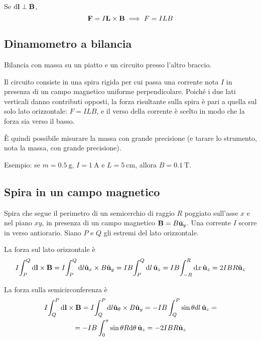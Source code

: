 Se $\mathrm{d} \mathbf{l} \perp \mathbf{B}$,
\begin{equation}
    \mathbf{F} = I \mathbf{L} \times \mathbf{B}
    \implies
    F = I L B
\end{equation}


\subsection{Dinamometro a bilancia}

Bilancia con massa su un piatto e un circuito presso l'altro braccio.

Il circuito consiste in una spira rigida per cui passa una corrente nota $I$ in presenza di un campo magnetico uniforme perpendicolare.
Poiché i due lati verticali danno contributi opposti, la forza risultante sulla spira è pari a quella sul solo lato orizzontale: $F = ILB$, e il verso della corrente è scelto in modo che la forza sia verso il basso.

È quindi possibile misurare la massa con grande precisione (e tarare lo strumento, nota la massa, con grande precisione).

Esempio: se $m = \qty{0.5}{\gram}$, $I = \qty{1}{\ampere}$ e $L = \qty{5}{\centi\metre}$, allora $B = \qty{0.1}{\tesla}$.

\subsection{Spira in un campo magnetico}

Spira che segue il perimetro di un semicerchio di raggio $R$ poggiato sull'asse $x$ e nel piano $xy$, in presenza di un campo magnetico $\mathbf{B} = B \hat{\mathbf{u}}_{y}$.
Una corrente $I$ scorre in verso antiorario. Siano $P$ e $Q$ gli estremi del lato orizzontale.

La forza sul lato orizzontale è
\begin{equation}
    I \!\int_P^Q \mathrm{d} \mathbf{l} \times \mathbf{B}
    = I \!\int_P^Q \mathrm{d} l \hat{\mathbf{u}}_{x} \times B \hat{\mathbf{u}}_{y}
    = I B \!\int_P^Q \mathrm{d} l \, \hat{\mathbf{u}}_{z}
    = I B \!\int_{-R}^R \mathrm{d} x \, \hat{\mathbf{u}}_{z}
    = 2IBR \hat{\mathbf{u}}_{z}
\end{equation}

La forza sulla semicirconferenza è
\begin{equation}
\begin{gathered}
    I \!\int_Q^P \mathrm{d} \mathbf{l} \times \mathbf{B}
    = I \!\int_Q^P \mathrm{d} l \hat{\mathbf{u}}_{\theta} \times B \hat{\mathbf{u}}_{y}
    = -IB \int_Q^P \sin\theta dl \, \hat{\mathbf{u}}_{z} = \\
    = -IB \int_0^\pi \sin\theta R \mathrm{d} \theta \, \hat{\mathbf{u}}_{z}
    = -2IBR \hat{\mathbf{u}}_{z}
\end{gathered}
\end{equation}

